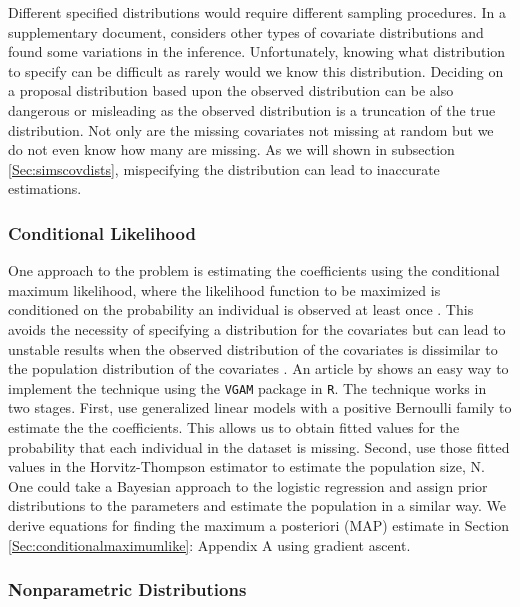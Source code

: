 \documentclass[
  12pt,
]{article}
\begin{document}
Different specified distributions would require different sampling
procedures. In a supplementary document, \cite{royle_analysis_2009}
considers other types of covariate distributions and found some
variations in the inference. Unfortunately, knowing what distribution to
specify can be difficult as rarely would we know this distribution.
Deciding on a proposal distribution based upon the observed distribution
can be also dangerous or misleading as the observed distribution is a
truncation of the true distribution. Not only are the missing covariates
not missing at random but we do not even know how many are missing. As
we will shown in subsection \ref{Sec:simscovdists}, mispecifying the
distribution can lead to inaccurate estimations.

\subsubsection{Conditional Likelihood}

One approach to the problem is estimating the coefficients using the
conditional maximum likelihood, where the likelihood function to be
maximized is conditioned on the probability an individual is observed at
least once \citep{alho_logistic_1990,huggins_statistical_1989}. This
avoids the necessity of specifying a distribution for the covariates but
can lead to unstable results when the observed distribution of the
covariates is dissimilar to the population distribution of the
covariates \citep{tilling_capture-recapture_1999}. An article by
\cite{yee_vgam_2015} shows an easy way to implement the technique using
the \texttt{VGAM} package in \texttt{R}. The technique works in two
stages. First, use generalized linear models with a positive Bernoulli
family to estimate the the coefficients. This allows us to obtain fitted
values for the probability that each individual in the dataset is
missing. Second, use those fitted values in the Horvitz-Thompson
estimator \citep{horvitz_generalization_1952} to estimate the population
size, N. One could take a Bayesian approach to the logistic regression
and assign prior distributions to the parameters and estimate the
population in a similar way. We derive equations for finding the maximum
a posteriori (MAP) estimate in Section \ref{Sec:conditionalmaximumlike}:
Appendix A using gradient ascent.

\subsubsection{Nonparametric Distributions}
\end{document}
